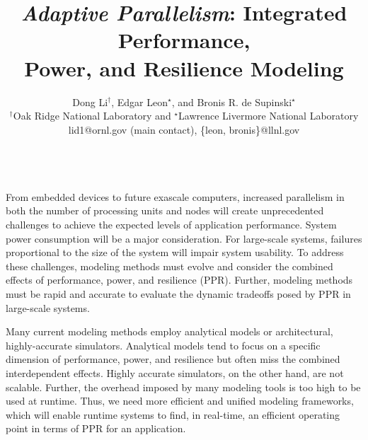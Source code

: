\documentclass{article}  %
\begin{document}
\title{\emph{Adaptive Parallelism}: Integrated Performance, \\Power, and Resilience Modeling}


\author{Dong Li$^{\dag}$, Edgar Leon$^{\star}$, and Bronis R. de Supinski$^{\star}$ \\
    $^{\dag}$Oak Ridge National Laboratory and $^{\star}$Lawrence Livermore National Laboratory \\
    lid1@ornl.gov (main contact), \{leon, bronis\}@llnl.gov	\\
}

\date{}

\maketitle

\\
From embedded devices to future exascale computers, increased
parallelism in both the number of processing units and nodes will
create unprecedented challenges to achieve the expected levels of
application performance. System power consumption will be a major 
consideration. For large-scale systems, failures proportional
to the size of the system will impair system usability. To address 
these challenges, modeling methods must evolve and consider the 
combined effects of performance, power, and resilience (PPR). 
Further, modeling methods must be rapid and accurate to evaluate 
the dynamic tradeoffs posed by PPR in large-scale systems. 


Many current modeling methods employ analytical models or architectural, 
highly-accurate simulators. Analytical models tend to focus on a specific 
dimension of performance, power, and resilience but often miss the combined 
interdependent effects. Highly accurate simulators, on the other hand, are 
not scalable. Further, the overhead imposed by many modeling tools is too 
high to be used at runtime. Thus, we need more efficient and unified modeling
frameworks, which will enable runtime systems to find, in real-time, an
efficient operating point in terms of PPR for an application. 
\end{document}
